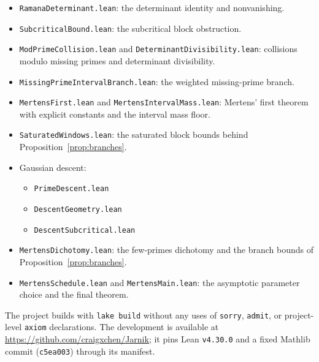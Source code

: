 \documentclass[11pt]{article}
\begin{document}
\begin{itemize}[leftmargin=2em]
\item \texttt{RamanaDeterminant.lean}: the determinant identity and nonvanishing.
\item \texttt{SubcriticalBound.lean}: the subcritical block obstruction.
\item \texttt{ModPrimeCollision.lean} and \texttt{DeterminantDivisibility.lean}: collisions modulo missing primes and determinant divisibility.
\item \texttt{MissingPrimeIntervalBranch.lean}: the weighted missing-prime branch.
\item \texttt{MertensFirst.lean} and \texttt{MertensIntervalMass.lean}: Mertens' first theorem with explicit constants and the interval mass floor.
\item \texttt{SaturatedWindows.lean}: the saturated block bounds behind Proposition~\ref{prop:branches}.
\item Gaussian descent:
\begin{itemize}[nosep,leftmargin=1.5em]
\item \texttt{PrimeDescent.lean}
\item \texttt{DescentGeometry.lean}
\item \texttt{DescentSubcritical.lean}
\end{itemize}
\item \texttt{MertensDichotomy.lean}: the few-primes dichotomy and the branch bounds of Proposition~\ref{prop:branches}.
\item \texttt{MertensSchedule.lean} and \texttt{MertensMain.lean}: the asymptotic parameter choice and the final theorem.
\end{itemize}

The project builds with \texttt{lake build} without any uses of \texttt{sorry}, \texttt{admit}, or project-level \texttt{axiom} declarations.
The development is available at \url{https://github.com/craigxchen/Jarnik}; it pins Lean \texttt{v4.30.0} and a fixed Mathlib commit (\texttt{c5ea003}) through its manifest.
\end{document}
